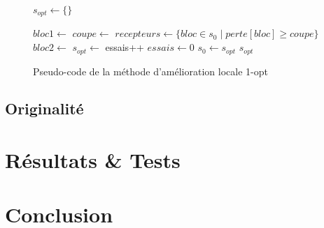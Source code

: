 \documentclass[10pt,a4paper]{article}
\begin{document}
\begin{figure}[h!]
\begin{algorithmic}

	\State $s_{opt} \gets \{\}$
	
		\State $ bloc1 \gets $ 
		\State $ coupe \gets $ 
		\State $ recepteurs \gets \{bloc \in s_{0} \mid perte[bloc] \geq coupe\}$
		\State $ bloc2 \gets $   
		\State {}
		\State $s_{opt} \gets $ 
		\State {}
			\State essais++
		\Else
			\State $essais \gets 0$
			\State $s_{0} \gets s_{opt}$
		\EndIf
	\EndWhile
	\State \Return $s_{opt}$
\EndFunction

\end{algorithmic}
\caption{Pseudo-code de la méthode d'amélioration locale 1-opt}
\end{figure}

\subsection{Originalité}

\section{Résultats \& Tests}

\section{Conclusion}
\end{document}
